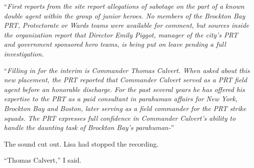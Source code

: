 ``\emph{First reports from the site report allegations of sabotage on the part of a known double agent within the group of junior heroes.  No members of the Brockton Bay PRT, Protectorate or Wards teams were available for comment, but sources inside the organization report that Director Emily Piggot, manager of the city's PRT and government sponsored hero teams, is being put on leave pending a full investigation.}



``\emph{Filling in for the interim is Commander Thomas Calvert.  When asked about this new placement, the PRT reported that Commander Calvert served as a PRT field agent before an honorable discharge.  For the past several years he has offered his expertise to the PRT as a paid consultant in parahuman affairs for New York, Brockton Bay and Boston, later serving as a field commander for the PRT strike squads.  The PRT expresses full confidence in Commander Calvert's ability to handle the daunting task of Brockton Bay's parahuman-}''



The sound cut out.  Lisa had stopped the recording.



``Thomas Calvert,'' I said.





